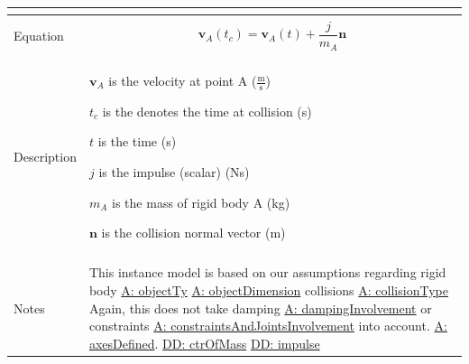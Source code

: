 \documentclass[12pt]{article}
\begin{document}
\begin{minipage}{\textwidth}
\begin{tabular}{p{} p{}}
\begin{displaymath}
                                                                  \end{displaymath}
                                                                  \\ \midrule \\
                                                                  Equation & \begin{displaymath}
                                                                             {\mathbf{v}_{A}}\left({t_{c}}\right)={\mathbf{v}_{A}}\left(t\right)+\frac{j}{{m_{A}}} \mathbf{n}
                                                                             \end{displaymath}
                                                                             \\ \midrule \\
                                                                             Description & \begin{symbDescription}
                                                                                           \item{${\mathbf{v}_{A}}$ is the velocity at point A ($\frac{\text{m}}{\text{s}}$)}
                                                                                           \item{${t_{c}}$ is the denotes the time at collision (s)}
                                                                                           \item{$t$ is the time (s)}
                                                                                           \item{$j$ is the impulse (scalar) (Ns)}
                                                                                           \item{${m_{A}}$ is the mass of rigid body A (kg)}
                                                                                           \item{$\mathbf{n}$ is the collision normal vector (m)}
                                                                                           \end{symbDescription}
                                                                                           \\ \midrule \\
                                                                                           Notes & This instance model is based on our assumptions regarding rigid body \hyperref[assumpOT]{A: objectTy} \hyperref[assumpOD]{A: objectDimension} collisions \hyperref[assumpCT]{A: collisionType} Again, this does not take damping \hyperref[assumpDI]{A: dampingInvolvement} or constraints \hyperref[assumpCAJI]{A: constraintsAndJointsInvolvement} into account. \hyperref[assumpAD]{A: axesDefined}. \hyperref[DD:ctrOfMass]{DD: ctrOfMass} \hyperref[DD:impulse]{DD: impulse}

\end{tabular}
\end{minipage}
\end{document}
